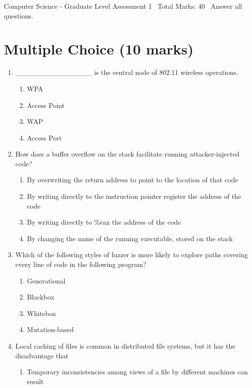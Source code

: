 \documentclass[12pt]{article}
\begin{document}
\begin{center}
Computer Science - Graduate Level Assessment 1 \
Total Marks: 40 \
Answer all questions.
\end{center}

\section*{Multiple Choice (10 marks)}
\begin{enumerate}[label=\arabic*.]
\item \_\_\_\_\_\_\_\_\_\_\_\_\_\_\_ is the central node of 802.11 wireless operations.
\begin{enumerate}[label=(\alph*)]
    \item WPA
    \item Access Point
    \item WAP
    \item Access Port
\end{enumerate}
\item How does a buffer overflow on the stack facilitate running attacker-injected code?
\begin{enumerate}[label=(\alph*)]
    \item By overwriting the return address to point to the location of that code
    \item By writing directly to the instruction pointer register the address of the code
    \item By writing directly to \%eax the address of the code
    \item By changing the name of the running executable, stored on the stack
\end{enumerate}
\item Which of the following styles of fuzzer is more likely to explore paths covering every line of code in the following program?
\begin{enumerate}[label=(\alph*)]
    \item Generational
    \item Blackbox
    \item Whitebox
    \item Mutation-based
\end{enumerate}
\item Local caching of files is common in distributed file systems, but it has the disadvantage that
\begin{enumerate}[label=(\alph*)]
    \item Temporary inconsistencies among views of a file by different machines can result

\end{enumerate}
\end{enumerate}
\end{document}
